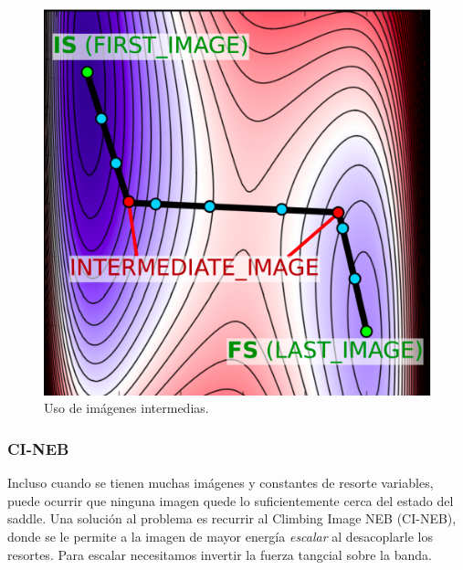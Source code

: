   \begin{figure}[H]
      \centering
      \includegraphics[scale = 0.4]{figs/D3/inter.png}
      \caption{Uso de imágenes intermedias.}
      \label{fig:inter}
  \end{figure}

\subsubsection{CI-NEB}

  Incluso cuando se tienen muchas imágenes y constantes de resorte variables, puede ocurrir que ninguna imagen quede lo suficientemente cerca del estado del saddle. Una solución al problema es recurrir al Climbing Image NEB (CI-NEB), donde se le permite a la imagen de mayor energía \emph{escalar} al desacoplarle los resortes. Para escalar necesitamos invertir la fuerza tangcial sobre la banda.

